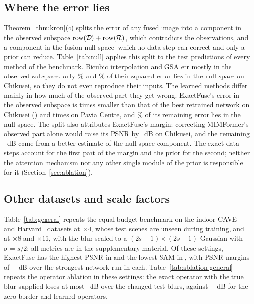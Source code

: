 \documentclass[journal]{IEEEtran}
\begin{document}
\subsection{Where the error lies}
\label{sec:nullsplit}
Theorem~\ref{thm:kron}(c) splits the error of any fused image into a component in the observed subspace $\mathrm{row}(\mathcal{D})+\mathrm{row}(\mathcal{R})$, which contradicts the observations, and a component in the fusion null space, which no data step can correct and only a prior can reduce. Table~\ref{tab:null} applies this split to the test predictions of every method of the benchmark. Bicubic interpolation and GSA err mostly in the observed subspace: only \% and \% of their squared error lies in the null space on Chikusei, so they do not even reproduce their inputs. The learned methods differ mainly in how much of the observed part they get wrong. ExactFuse's error in the observed subspace is  times smaller than that of the best retrained network on Chikusei () and  times on Pavia Centre, and \% of its remaining error lies in the null space. The split also attributes ExactFuse's margin: correcting MIMFormer's observed part alone would raise its PSNR by ~dB on Chikusei, and the remaining ~dB come from a better estimate of the null-space component. The exact data steps account for the first part of the margin and the prior for the second; neither the attention mechanism nor any other single module of the prior is responsible for it (Section~\ref{sec:ablation}).


\subsection{Other datasets and scale factors}
\label{sec:general}
Table~\ref{tab:general} repeats the equal-budget benchmark on the indoor CAVE~\cite{yasuma2010cave} and Harvard~\cite{chakrabarti2011harvard} datasets at $\times4$, whose test scenes are unseen during training, and at $\times8$ and $\times16$, with the blur scaled to a $(2s-1)\times(2s-1)$ Gaussian with $\sigma=s/2$; all metrics are in the supplementary material. Of these  settings, ExactFuse has the highest PSNR in  and the lowest SAM in , with PSNR margins of --~dB over the strongest network run in each. Table~\ref{tab:ablation-general} repeats the operator ablation in these settings: the exact operator with the true blur supplied loses at most ~dB over the changed test blurs, against --~dB for the zero-border and learned operators.
\end{document}
